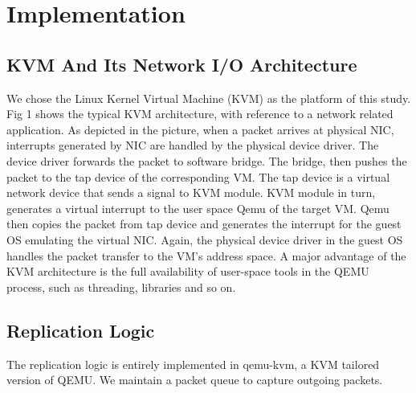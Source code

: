  \section{Implementation} \label{sec:impl}

\subsection{KVM And Its Network I/O Architecture}\label{sec:architecture}
We chose the Linux Kernel Virtual Machine (KVM) as the platform of this study.
Fig 1 shows the typical KVM architecture, with reference to a network related 
application. As depicted in the picture, when a packet arrives at physical NIC, 
interrupts generated by NIC are handled by the physical device driver. The device 
driver forwards the packet to software bridge. The bridge, then pushes the packet 
to the tap device of the corresponding VM. The tap device is a virtual network 
device that sends a signal to KVM module. KVM module in turn, generates a virtual 
interrupt to the user space Qemu of the target VM. Qemu then copies the packet from 
tap device and generates the interrupt for the guest OS emulating the virtual NIC. 
Again, the physical device driver in the guest OS handles the packet transfer to 
the VM’s address space. A major advantage of the KVM architecture is the full 
availability of user-space tools in the QEMU process, such as threading, libraries 
and so on.
\subsection{Replication Logic}\label{sec:Replication}
The replication logic is entirely implemented in qemu-kvm, a KVM tailored version of QEMU.
We maintain a packet queue to capture outgoing packets.
